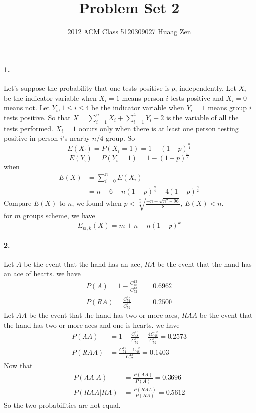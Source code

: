 \documentclass{article}
\author{2012 ACM Class 5120309027 Huang Zen}
\title{Problem Set 2}
\date{}
\begin{document}
\maketitle
\paragraph{1.}
Let's suppose the probability that one tests positive is $p$,
independently. Let $X_i$ be the indicator variable when $X_i=1$ means
person $i$ tests positive and $X_i=0$ means not. Let $Y_i,1\leq i\leq 4$
be the indicator variable when $Y_i=1$ means group $i$ tests positive.
So that $X = \displaystyle \sum_{i=1}^{n} X_i + \sum_{i=1}^{4} Y_i + 2$ is
the variable of all the tests performed. $X_i=1$ occurs only when
there is at least one person testing positive in person $i$'s nearby
$n/4$ group. So 
$$ E(X_i) = P(X_i=1) = 1 - (1-p)^\frac{n}{4} $$
$$ E(Y_i) = P(Y_i=1) = 1 - (1-p)^\frac{n}{2} $$
when
\begin{align*}
E(X) &= \sum_{i=0}^{n} E(X_i) \\
     &= n + 6 - n (1-p)^\frac{n}{4} - 4 (1-p)^\frac{n}{2}
\end{align*}
Compare $E(X)$ to $n$, we found when $p <
\sqrt[\frac{n}{4}]{\frac{-n+\sqrt{n^2+96}}{8}}$, $E(X) < n$.
\\
for $m$ groups scheme, we have
$$
E_{m,k}(X) = m + n - n (1-p)^k
$$


\paragraph{2.}
Let $A$ be the event that the hand has an ace, $RA$ be the event that
the hand has an ace of hearts. we have
\begin{align*}
P(A) = 1 - \frac{C^{13}_{48}}{C^{13}_{52}} &= 0.6962 \\
P(RA) = \frac{C^{12}_{51}}{C^{13}_{52}} &= 0.2500
\end{align*}
Let $AA$ be the event that the hand has two or more aces, $RAA$ be the event
that the hand has two or more aces and one is hearts. we have
\begin{align*}
P(AA) &= 1 - \frac{C^{13}_{48}}{C^{13}_{52}} -
\frac{4C^{12}_{48}}{C^{13}_{52}} = 0.2573 \\
P(RAA) &= \frac{C^{12}_{51}-C^{12}_{48}}{C^{13}_{52}} = 0.1403
\end{align*}
Now that
\begin{align*}
P(AA | A) &= \frac{P(AA)}{P(A)} = 0.3696\\
P(RAA | RA) &= \frac{P(RAA)}{P(RA)} = 0.5612
\end{align*}
So the two probabilities are not equal.
\end{document}
